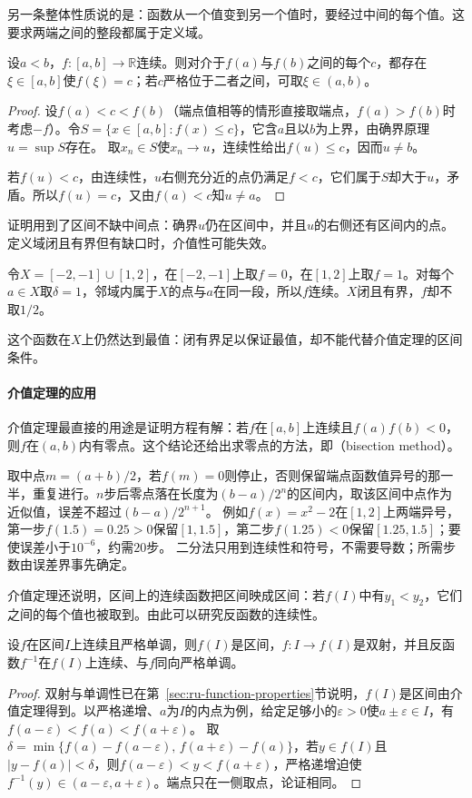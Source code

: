 另一条整体性质说的是：函数从一个值变到另一个值时，要经过中间的每个值。这要求两端之间的整段都属于定义域。
\begin{theorem}[介值定理]
\label{thm:analysis-intermediate-value}
设$a<b$，$f:[a,b]\to\mathbb R$连续。则对介于$f(a)$与$f(b)$之间的每个$c$，都存在$\xi\in[a,b]$使$f(\xi)=c$；若$c$严格位于二者之间，可取$\xi\in(a,b)$。
\end{theorem}
\begin{proof}
设$f(a)<c<f(b)$（端点值相等的情形直接取端点，$f(a)>f(b)$时考虑$-f$）。令$S=\{x\in[a,b]:f(x)\leq c\}$，它含$a$且以$b$为上界，由确界原理$u=\sup S$存在。
取$x_n\in S$使$x_n\to u$，连续性给出$f(u)\leq c$，因而$u\neq b$。

若$f(u)<c$，由连续性，$u$右侧充分近的点仍满足$f<c$，它们属于$S$却大于$u$，矛盾。所以$f(u)=c$，又由$f(a)<c$知$u\neq a$。
\end{proof}
证明用到了区间不缺中间点：确界$u$仍在区间中，并且$u$的右侧还有区间内的点。定义域闭且有界但有缺口时，介值性可能失效。
\begin{example}[有缺口的定义域上不取中间值]
\label{ex:analysis-intermediate-value-gap}
令$X=[-2,-1]\cup[1,2]$，在$[-2,-1]$上取$f=0$，在$[1,2]$上取$f=1$。对每个$a\in X$取$\delta=1$，邻域内属于$X$的点与$a$在同一段，所以$f$连续。$X$闭且有界，$f$却不取$1/2$。
\end{example}
这个函数在$X$上仍然达到最值：闭有界足以保证最值，却不能代替介值定理的区间条件。

\paragraph{介值定理的应用}
介值定理最直接的用途是证明方程有解：若$f$在$[a,b]$上连续且$f(a)f(b)<0$，则$f$在$(a,b)$内有零点。这个结论还给出求零点的方法，即（bisection method）。

取中点$m=(a+b)/2$，若$f(m)=0$则停止，否则保留端点函数值异号的那一半，重复进行。$n$步后零点落在长度为$(b-a)/2^n$的区间内，取该区间中点作为近似值，误差不超过$(b-a)/2^{n+1}$。
例如$f(x)=x^2-2$在$[1,2]$上两端异号，第一步$f(1.5)=0.25>0$保留$[1,1.5]$，第二步$f(1.25)<0$保留$[1.25,1.5]$；要使误差小于$10^{-6}$，约需$20$步。
二分法只用到连续性和符号，不需要导数；所需步数由误差界事先确定。

介值定理还说明，区间上的连续函数把区间映成区间：若$f(I)$中有$y_1<y_2$，它们之间的每个值也被取到。由此可以研究反函数的连续性。
\begin{theorem}[严格单调连续函数的反函数]
\label{thm:ru-inverse-continuity}
\label{sec:analysis-inverse-continuity}
设$f$在区间$I$上连续且严格单调，则$f(I)$是区间，$f:I\to f(I)$是双射，并且反函数$f^{-1}$在$f(I)$上连续、与$f$同向严格单调。
\end{theorem}
\begin{proof}
双射与单调性已在第~\ref{sec:ru-function-properties}节说明，$f(I)$是区间由介值定理得到。以严格递增、$a$为$I$的内点为例，给定足够小的$\varepsilon>0$使$a\pm\varepsilon\in I$，有$f(a-\varepsilon)<f(a)<f(a+\varepsilon)$。
取$\delta=\min\{f(a)-f(a-\varepsilon),\,f(a+\varepsilon)-f(a)\}$，若$y\in f(I)$且$|y-f(a)|<\delta$，则$f(a-\varepsilon)<y<f(a+\varepsilon)$，严格递增迫使$f^{-1}(y)\in(a-\varepsilon,a+\varepsilon)$。端点只在一侧取点，论证相同。
\end{proof}

